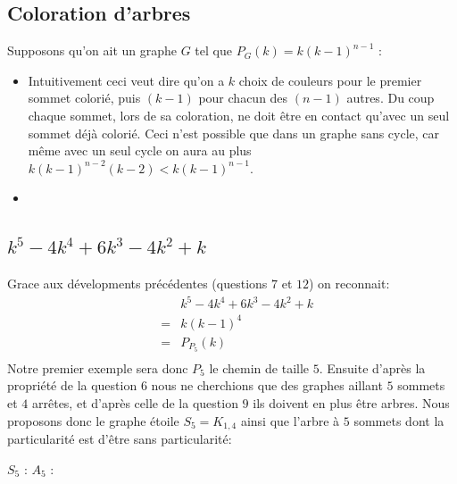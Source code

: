 \subsection{Coloration d'arbres}
Supposons qu'on ait un graphe $G$ tel que $P_G(k) = k(k-1)^{n-1}$ :
\begin {itemize}
\item Intuitivement ceci veut dire qu'on a $k$ choix de couleurs pour le premier sommet colorié, puis $(k-1)$ pour chacun des $(n-1)$ autres. Du coup chaque sommet, lors de sa coloration, ne doit être en contact qu'avec un seul sommet déjà colorié. Ceci n'est possible que dans un graphe sans cycle, car même avec un seul cycle on aura au plus $k(k-1)^{n-2}(k-2) < k(k-1)^{n-1}$.
\item 
\end {itemize}

\subsection{$k^5 - 4k^4 + 6k^3 - 4k^2 + k$}
Grace aux dévelopments précédentes (questions $7$ et $12$) on reconnait:
\begin{eqnarray*}
&&		k^5 - 4k^4 + 6k^3 - 4k^2 + k 	\\	
&=&		k(k-1)^4						\\
&=&		P_{P_5}(k)						\\
\end{eqnarray*}
Notre premier exemple sera donc $P_5$ le chemin de taille $5$. Ensuite d'après la propriété de la question $6$ nous ne cherchions que des graphes aillant $5$ sommets et $4$ arrêtes, et d'après celle de la question $9$ ils doivent en plus être arbres. Nous proposons donc le graphe étoile $S_5 = K_{1,4}$ ainsi que l'arbre à $5$ sommets dont la particularité est d'être sans particularité:

\begin{center}
$S_5$ :  \hspace{3cm}
$A_5$ : 
\end{center}

